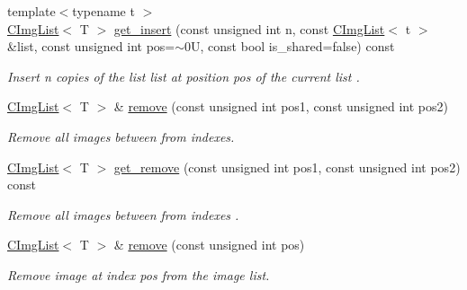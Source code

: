 \begin{Indent}
\begin{DoxyCompactItemize}
\mbox{\label{structcimg__library__suffixed_1_1CImgList_a8ffdc28d3b72f9d114fc3eaa3aef6784}} 
{\footnotesize template$<$typename t $>$ }\\\hyperlink{structcimg__library__suffixed_1_1CImgList}{C\+Img\+List}$<$ T $>$ \hyperlink{structcimg__library__suffixed_1_1CImgList_a8ffdc28d3b72f9d114fc3eaa3aef6784}{get\+\_\+insert} (const unsigned int n, const \hyperlink{structcimg__library__suffixed_1_1CImgList}{C\+Img\+List}$<$ t $>$ \&list, const unsigned int pos=$\sim$0\+U, const bool is\+\_\+shared=false) const
\begin{DoxyCompactList}\small\item\em Insert n copies of the list {\ttfamily list} at position {\ttfamily pos} of the current list . \end{DoxyCompactList}\item 
\hyperlink{structcimg__library__suffixed_1_1CImgList}{C\+Img\+List}$<$ T $>$ \& \hyperlink{structcimg__library__suffixed_1_1CImgList_a5ba43383fa88dd0cbd26db1511280cc5}{remove} (const unsigned int pos1, const unsigned int pos2)
\begin{DoxyCompactList}\small\item\em Remove all images between from indexes. \end{DoxyCompactList}\item 
\mbox{\label{structcimg__library__suffixed_1_1CImgList_aad9b24fea87caadce09c676dea0bac0a}} 
\hyperlink{structcimg__library__suffixed_1_1CImgList}{C\+Img\+List}$<$ T $>$ \hyperlink{structcimg__library__suffixed_1_1CImgList_aad9b24fea87caadce09c676dea0bac0a}{get\+\_\+remove} (const unsigned int pos1, const unsigned int pos2) const
\begin{DoxyCompactList}\small\item\em Remove all images between from indexes . \end{DoxyCompactList}\item 
\hyperlink{structcimg__library__suffixed_1_1CImgList}{C\+Img\+List}$<$ T $>$ \& \hyperlink{structcimg__library__suffixed_1_1CImgList_ae06b3426c496dcd8ad456a7d7aca0117}{remove} (const unsigned int pos)
\begin{DoxyCompactList}\small\item\em Remove image at index {\ttfamily pos} from the image list. \end{DoxyCompactList}\item 

\end{DoxyCompactItemize}
\end{Indent}

